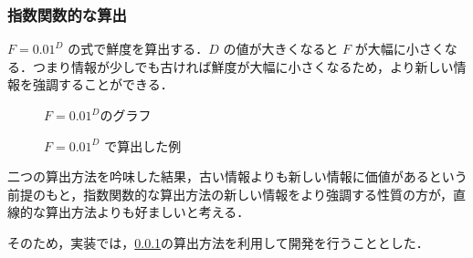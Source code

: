 \subsubsection{指数関数的な算出}
\label{subsec:exponential}

$ F =  0.01 ^ D $ の式で鮮度を算出する．$D$ の値が大きくなると $F$ が大幅に小さくなる．つまり情報が少しでも古ければ鮮度が大幅に小さくなるため，より新しい情報を強調することができる．

\begin{figure}[htbp]
  \begin{minipage}{0.5\hsize}
    \begin{center}
    \end{center}
    \caption{$ F =  0.01 ^ D $のグラフ}
  \end{minipage}
  \begin{minipage}{0.5\hsize}
    \begin{center}
    \end{center}
    \caption{$ F =  0.01 ^ D $ で算出した例}
  \end{minipage}
\end{figure}


二つの算出方法を吟味した結果，古い情報よりも新しい情報に価値があるという前提のもと，指数関数的な算出方法の新しい情報をより強調する性質の方が，直線的な算出方法よりも好ましいと考える．

そのため，実装では，\ref{subsec:exponential}の算出方法を利用して開発を行うこととした．
